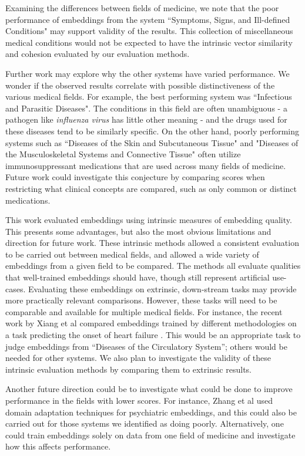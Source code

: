 \documentclass[11pt,a4paper]{article}
\begin{document}
Examining the differences between fields of medicine, we note that the poor performance of embeddings from the system ``Symptoms, Signs, and Ill-defined Conditions" may support validity of the results. This collection of miscellaneous medical conditions would not be expected to have the intrinsic vector similarity and cohesion evaluated by our evaluation methods.   

Further work may explore why the other systems have varied performance. We wonder if the observed results correlate with possible distinctiveness of the various medical fields. For example, the best performing system was ``Infectious and Parasitic Diseases". The conditions in this field are often unambiguous - a pathogen like \emph{influenza virus} has little other meaning - and the drugs used for these diseases tend to be similarly specific. On the other hand,  poorly performing systems such as ``Diseases of the Skin and Subcutaneous Tissue" and "Diseases of the Musculoskeletal Systems and Connective Tissue" often utilize immunosuppressant medications that are used across many fields of medicine. Future work could investigate this conjecture by comparing scores when restricting what clinical concepts are compared, such as only common or distinct medications. 

This work evaluated embeddings using intrinsic measures of embedding quality. This presents some advantages, but also the most obvious limitations and direction for future work. These intrinsic methods allowed a consistent evaluation to be carried out between medical fields, and allowed a wide variety of embeddings from a given field to be compared. The methods all evaluate qualities that well-trained embeddings should have, though still represent artificial use-cases. Evaluating these embeddings on extrinsic, down-stream tasks may provide more practically relevant comparisons. However, these tasks will need to be comparable and available for multiple medical fields. For instance, the recent work by Xiang et al  compared embeddings trained by different methodologies on a task predicting the onset of heart failure \cite{rasmyStudyGeneralizabilityRecurrent2018}. This would be an appropriate task to judge embeddings from ``Diseases of the Circulatory System'';  others would be needed for other systems. We  also plan to investigate the validity of these intrinsic evaluation methods by comparing them to extrinsic results. 

Another future direction could be to investigate what could be done to improve performance in the fields with lower scores. For instance, Zhang et al  used domain adaptation techniques for psychiatric embeddings, and this could also be carried out for those systems we identified as doing poorly. Alternatively, one could train embeddings solely on data from one field of medicine and investigate how this affects performance. 
\end{document}

